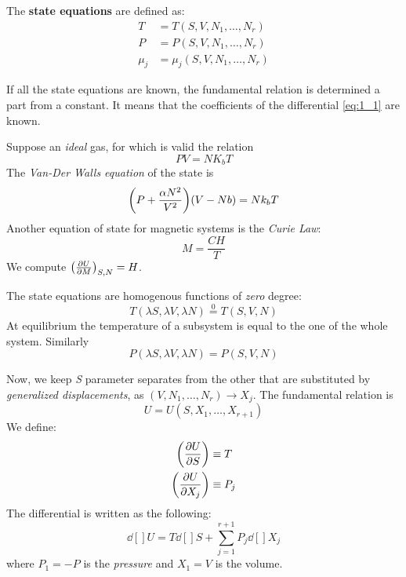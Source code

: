 \documentclass[../main/main.tex]{subfiles}
\begin{document}
 The \textbf{state equations} are defined as:
\begin{subequations}
\begin{align}
  T &= T (S,V,N_1,\dots,N_r) \\
  P &= P (S,V,N_1,\dots,N_r) \\
  \mu _j &= \mu _j (S,V,N_1,\dots,N_r)
\end{align}
\label{}
\end{subequations}
\begin{remark}
If all the state equations are known, the fundamental relation is determined a part from a constant. It means that the coefficients of the differential \eqref{eq:1_1} are known.
\end{remark}
\begin{example}
Suppose an \emph{ideal} gas, for which is valid the relation
\begin{equation}
  P V = N K_b T
\end{equation}
The \emph{Van-Der Walls equation} of the state is
\begin{equation}
  \qty(P+\frac{\alpha N^2}{V^2})\qty(V-Nb) = N k_b T
\end{equation}
Another equation of state for magnetic systems is the \emph{Curie Law}:
\begin{equation}
M=\frac{C H}{T}
\end{equation}
We compute \( \qty(\pdv{U}{M} )_{S,N}=H  \).
\end{example}

The state equations are homogenous functions of \emph{zero} degree:
\begin{equation}
  T (\lambda S, \lambda V, \lambda N) \overset{0}{=} T (S,V,N)
  \label{eq:}
\end{equation}
At equilibrium the temperature of a subsystem is equal to the one of the whole system.
Similarly
\begin{equation}
  P (\lambda S, \lambda V, \lambda N) = P (S,V,N)
  \label{eq:}
\end{equation}

Now, we keep \emph{S} parameter separates from the other that are substituted by \emph{generalized displacements}, as \( (V,N_1,\dots,N_r) \rightarrow X_j \). The fundamental relation is
\begin{equation}
  U=U(S,X_1,\dots,X_{r+1})
\end{equation}
 We define:
\begin{subequations}
\begin{align}
  \qty(\pdv{U}{S}) & \equiv   T  \\
  \qty(\pdv{U}{X_j}) & \equiv  P_j
\end{align}
\end{subequations}
The differential is written as the following:
\begin{equation}
  \dd[]{U} = T \dd[]{S} + \sum_{j=1}^{r+1} P_j \dd[]{X_j}
  \label{eq:}
\end{equation}
where \( P_1 = -P \) is the \emph{pressure} and \( X_1 = V \) is the volume.
\end{document}
